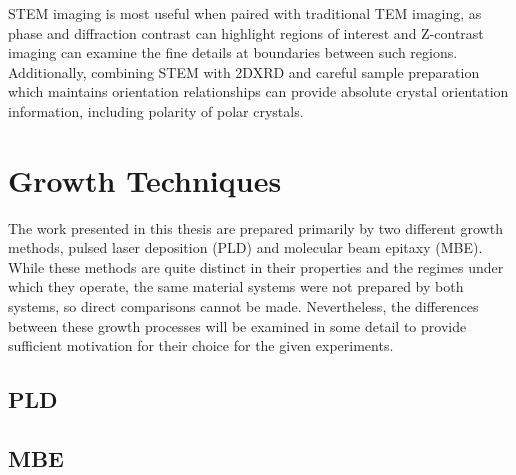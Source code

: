 STEM imaging is most useful when paired with traditional TEM imaging, as phase and diffraction contrast can highlight regions of interest and Z-contrast imaging can examine the fine details at boundaries between such regions. Additionally, combining STEM with 2DXRD and careful sample preparation which maintains orientation relationships can provide absolute crystal orientation information, including polarity of polar crystals.

\section{Growth Techniques}
The work presented in this thesis are prepared primarily by two different growth methods, pulsed laser deposition (PLD) and molecular beam epitaxy (MBE). While these methods are quite distinct in their properties and the regimes under which they operate, the same material systems were not prepared by both systems, so direct comparisons cannot be made. Nevertheless, the differences between these growth processes will be examined in some detail to provide sufficient motivation for their choice for the given experiments.
\subsection{PLD}
\subsection{MBE}
